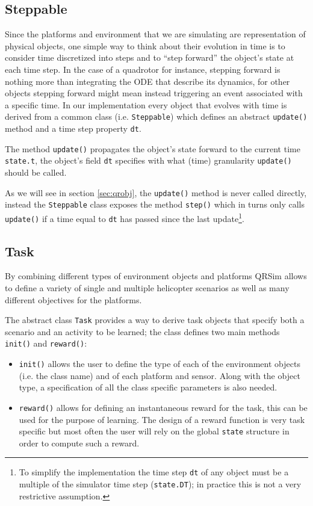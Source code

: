 \documentclass[a4paper,11pt]{report}
\newcommand{\sname}{QRSim\xspace}
\begin{document}
\subsection{Steppable}

Since the platforms and environment that we are simulating are representation of physical objects, one simple way to think about their evolution in time is to consider time discretized into steps and to ``step forward'' the object's state at each time step. In the case of a quadrotor for instance, stepping forward is nothing more than integrating the ODE that describe its dynamics, for other objects stepping forward might mean instead triggering an event associated with a specific time.
In our implementation every object that evolves with time is derived from a common class (i.e. \texttt{Steppable}) which defines an abstract \texttt{update()} method and a time step property \texttt{dt}.

The method \texttt{update()} propagates the object's state forward to the current time \texttt{state.t}, the object's field \texttt{dt} specifies with what (time) granularity \texttt{update()} should be called. 

As we will see in section \ref{sec:qrobj}, the \texttt{update()} method is never called directly, instead the  \texttt{Steppable} class exposes the method \texttt{step()} which in turns only calls \texttt{update()} if a time equal to \texttt{dt} has passed since the last update\footnote{To simplify the implementation the time step \texttt{dt} of any object must be a multiple of the simulator time step (\texttt{state.DT}); in practice this is not a very restrictive assumption.}.

\subsection{Task}

By combining different types of environment objects and platforms \sname allows to define a variety of single and multiple helicopter scenarios as well as many different objectives for the platforms.

The abstract class \texttt{Task} provides a way to derive task objects that specify both a scenario and an activity to be learned; the class defines two main methods \texttt{init()} and \texttt{reward()}:
\begin{itemize}
 \item \texttt{init()} allows the user to define the type of each of the environment objects (i.e. the class name) and of each platform and sensor. Along with the object type, a specification of all the class specific parameters is also needed.
 \item \texttt{reward()} allows for defining an instantaneous reward for the task, this can be used for the purpose of learning. The design of a reward function is very task specific but most often the user will rely on the global \texttt{state} structure in order to compute such a reward.
\end{itemize}
\end{document}
